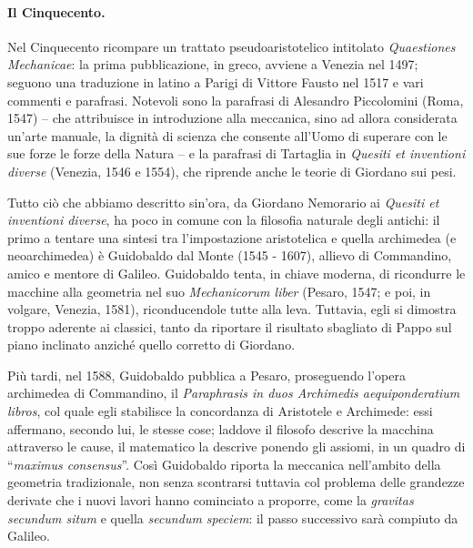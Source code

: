 \paragraph{Il Cinquecento.} Nel Cinquecento ricompare un trattato pseudoaristotelico intitolato \textit{Quaestiones Mechanicae}: la prima pubblicazione, in greco, avviene a Venezia nel 1497; seguono una traduzione in latino a Parigi di Vittore Fausto nel 1517 e vari commenti e parafrasi. Notevoli sono la parafrasi di Alesandro Piccolomini (Roma, 1547) -- che attribuisce in introduzione alla meccanica, sino ad allora considerata un'arte manuale, la dignit\`a di scienza che consente all'Uomo di superare con le sue forze le forze della Natura -- e la parafrasi di Tartaglia in \textit{Quesiti et inventioni diverse} (Venezia, 1546 e 1554), che riprende anche le teorie di Giordano sui pesi.
\par Tutto ci\`o che abbiamo descritto sin'ora, da Giordano Nemorario ai \textit{Quesiti et inventioni diverse}, ha poco in comune con la filosofia naturale degli antichi: il primo a tentare una sintesi tra l'impostazione aristotelica e quella archimedea (e neoarchimedea) \`e Guidobaldo dal Monte (1545 - 1607), allievo di Commandino, amico e mentore di Galileo. Guidobaldo tenta, in chiave moderna, di ricondurre le macchine alla geometria nel suo \textit{Mechanicorum liber} (Pesaro, 1547; e poi, in volgare, Venezia, 1581), riconducendole tutte alla leva. Tuttavia, egli si dimostra troppo aderente ai classici, tanto da riportare il risultato sbagliato di Pappo sul piano inclinato anzich\'e quello corretto di Giordano.
\par Pi\`u tardi, nel 1588, Guidobaldo pubblica a Pesaro, proseguendo l'opera archimedea di Commandino, il \textit{Paraphrasis in duos Archimedis aequiponderatium libros}, col quale egli stabilisce la concordanza di Aristotele e Archimede: essi affermano, secondo lui, le stesse cose; laddove il filosofo descrive la macchina attraverso le cause, il matematico la descrive ponendo gli assiomi, in un quadro di ``\textit{maximus consensus}''. Cos\`i Guidobaldo riporta la meccanica nell'ambito della geometria tradizionale, non senza scontrarsi tuttavia col problema delle grandezze derivate che i nuovi lavori hanno cominciato a proporre, come la \textit{gravitas secundum situm} e quella \textit{secundum speciem}: il passo successivo sar\`a compiuto da Galileo.
